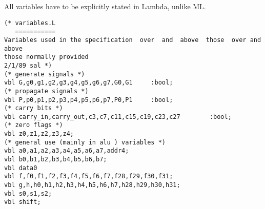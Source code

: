 All variables have to be explicitly stated in Lambda, unlike ML.
\begin{verbatim}
(* variables.L
   ===========
Variables used in the specification  over  and  above  those  over and above
those normally provided 
2/1/89 sal *)
(* generate signals *)
vbl G,g0,g1,g2,g3,g4,g5,g6,g7,G0,G1     :bool;
(* propagate signals *)
vbl P,p0,p1,p2,p3,p4,p5,p6,p7,P0,P1     :bool;
(* carry bits *)
vbl carry_in,carry_out,c3,c7,c11,c15,c19,c23,c27        :bool;
(* zero flags *)
vbl z0,z1,z2,z3,z4;
(* general use (mainly in alu ) variables *)
vbl a0,a1,a2,a3,a4,a5,a6,a7,addr4;
vbl b0,b1,b2,b3,b4,b5,b6,b7;
vbl data0
vbl f,f0,f1,f2,f3,f4,f5,f6,f7,f28,f29,f30,f31;
vbl g,h,h0,h1,h2,h3,h4,h5,h6,h7,h28,h29,h30,h31;
vbl s0,s1,s2;
vbl shift;
\end{verbatim}
